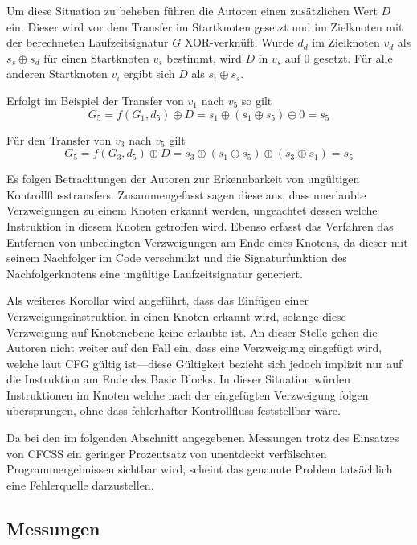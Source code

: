 \documentclass[11pt]{article}
\begin{document}
Um diese Situation zu beheben führen die Autoren einen zusätzlichen Wert
$ D $ ein. Dieser wird vor dem Transfer im Startknoten gesetzt und im
Zielknoten mit der berechneten Laufzeitsignatur $ G $ XOR-verknüft.  Wurde
$ d_d $ im Zielknoten $ v_d $ als $ s_s \oplus s_d $ für einen Startknoten
$ v_s $ bestimmt, wird $ D $ in $ v_s $ auf $ 0 $ gesetzt. Für alle anderen
Startknoten $ v_i $ ergibt sich $ D $ als $ s_i \oplus s_s $.

Erfolgt im Beispiel der Transfer von $ v_1 $ nach $ v_5 $ so gilt $$ G_5
= f(G_1, d_5) \oplus D = s_1 \oplus (s_1 \oplus s_5) \oplus 0 = s_5 $$

Für den Transfer von $ v_3 $ nach $ v_5 $ gilt $$ G_5 = f(G_3, d_5) \oplus
D = s_3 \oplus (s_1 \oplus s_5) \oplus (s_3 \oplus s_1) = s_5 $$


Es folgen Betrachtungen der Autoren zur Erkennbarkeit von ungültigen
Kontrollflusstransfers. Zusammengefasst sagen diese aus, dass unerlaubte
Verzweigungen zu einem Knoten erkannt werden, ungeachtet dessen welche
Instruktion in diesem Knoten getroffen wird. Ebenso erfasst das Verfahren das
Entfernen von unbedingten Verzweigungen am Ende eines Knotens, da dieser mit
seinem Nachfolger im Code verschmilzt und die Signaturfunktion des
Nachfolgerknotens eine ungültige Laufzeitsignatur generiert.

Als weiteres Korollar wird angeführt, dass das Einfügen einer
Verzweigungsinstruktion in einen Knoten erkannt wird, solange diese Verzweigung
auf Knotenebene keine erlaubte ist. An dieser Stelle gehen die Autoren nicht
weiter auf den Fall ein, dass eine Verzweigung eingefügt wird, welche laut CFG
gültig ist—diese Gültigkeit bezieht sich jedoch implizit nur auf die
Instruktion am Ende des Basic Blocks. In dieser Situation würden Instruktionen
im Knoten welche nach der eingefügten Verzweigung folgen übersprungen, ohne
dass fehlerhafter Kontrollfluss feststellbar wäre.

Da bei den im folgenden Abschnitt angegebenen Messungen trotz des Einsatzes von
CFCSS ein geringer Prozentsatz von unentdeckt verfälschten Programmergebnissen
sichtbar wird, scheint das genannte Problem tatsächlich eine Fehlerquelle
darzustellen.

\subsection{Messungen}
\end{document}

